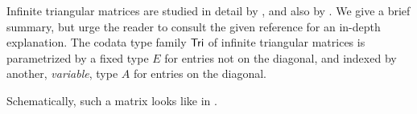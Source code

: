\documentclass[a4paper,USenglish]{lipics}
\begin{document}
\begin{ex}\label{ex_tri}
Infinite triangular matrices are studied in detail by
 \textcite{DBLP:conf/types/MatthesP11}, and also by \textcite{DBLP:journals/tcs/AbelMU05}.
 We give a brief summary, but urge the reader to consult the given reference 
 for an in-depth explanation. 
 The codata type family $\mathsf{Tri}$ of infinite triangular matrices 
 is parametrized by a fixed type $E$ for entries not on the diagonal, 
 and indexed by another, \emph{variable}, type $A$ for entries on 
 the diagonal. 
\begin{Long}
 Schematically, such a matrix looks like in .
 \begin{figure}[bt]
 \centering
\end{figure}
\end{Long}
\end{ex}
\end{document}
